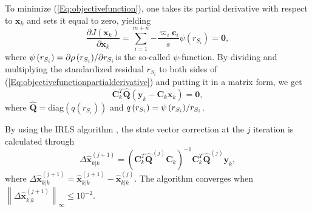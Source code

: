 \documentclass[10pt]{IEEEtran}
\begin{document}
To minimize (\ref{Eq:objectivefunction}), one takes its partial derivative with respect to $\bm{x}_k$ and sets it equal to zero, yielding
\begin{equation}
\frac{{\partial J\left( \bm{x}_k \right)}}{{\partial \bm{x}_k}} = \sum\limits_{i = 1}^{m+n} { - \frac{{{\varpi _i}{\bm{c}_i}}}{s}\psi \left( {{r_{{S_i}}}} \right)}  = \bm{0},
\label{Eq:objectivefunctionpartialderivative}
\end{equation}
where $\psi \left( {{r_{{S_i}}}} \right) = {{\partial \rho \left( {{r_{{S_i}}}} \right)} \mathord{\left/
 {\vphantom {{\partial \rho \left( {{r_{{S_i}}}} \right)} {{ r_{{S_i}}}}}} \right.
 \kern-\nulldelimiterspace} \partial{{r_{{S_i}}}}}$is the so-called $\psi$-function. By dividing and multiplying the standardized residual $r_{{S_i}}$ to both sides of (\ref{Eq:objectivefunctionpartialderivative}) and putting it in a matrix form, we get
\begin{equation}
{\bm{C}_k^T}\bm{\widehat{Q}}\left( {\bm{y}_k -\bm{C}_k \bm{x}_k } \right) = \bm{0},
\label{Eq:objectivefunctionpartialderivativematrixform}
\end{equation}
where $\bm{\widehat Q} =$diag${\left( {q\left( {{r_{{S_i}}}} \right)} \right)}$  and $q\left( {{r_{{S_i}}}} \right) = {{\psi \left( {{r_{{S_i}}}} \right)} \mathord{\left/{\vphantom {{\psi \left( {{r_{{S_i}}}} \right)} {{r_{{S_i}}}}}} \right.\kern-\nulldelimiterspace}{{r_{{S_i}}}}}$.

By using the IRLS algorithm \cite{Lmili2007,Hampel1986}, the state vector correction at the $j$ iteration is calculated through
\begin{equation}
\Delta \bm{\widehat x}_{k\left| k \right.}^{\left( {j + 1} \right)} = {\left( {\bm{C}_k^T{\bm{\widehat Q}^{\left( j \right)}}{\bm{C}_k}} \right)^{ - 1}}\bm{C}_k^T{\bm{\widehat Q}^{\left( j \right)}}\bm{y}_k,
\label{Eq:IRLS}
\end{equation}
where $\Delta \bm{\widehat x}_{k\left| k \right.}^{\left( {j + 1} \right)}=\bm{\widehat x}_{k\left| k \right.}^{\left( {j + 1} \right)}-\bm{\widehat x}_{k\left| k \right.}^{\left( {j} \right)}$. The algorithm converges when ${\left\| {\Delta \bm{\widehat x}_{k\left| k \right.}^{\left( {j + 1} \right)}} \right\|_\infty } \le {10^{ - 2}}$.
\end{document}
